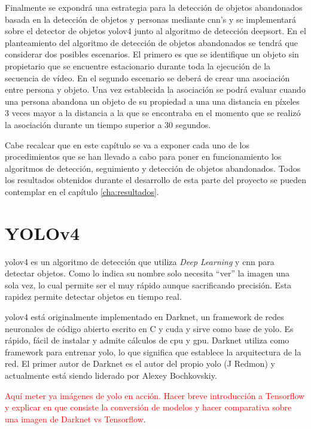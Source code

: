 Finalmente se expondrá una estrategia para la detección de objetos abandonados basada en la detección de objetos y personas mediante \gls{cnn}'s y se implementará sobre el detector de objetos \gls{yolov4} junto al algoritmo de detección \gls{deepsort}. En el planteamiento del algoritmo de detección de objetos abandonados se tendrá que considerar dos posibles escenarios. El primero es que se identifique un objeto sin propietario que se encuentre estacionario durante toda la ejecución de la secuencia de vídeo. En el segundo escenario se deberá de crear una asociación entre persona y objeto. Una vez establecida la asociación se podrá evaluar cuando una persona abandona un objeto de su propiedad a una una distancia en píxeles 3 veces mayor a la distancia a la que se encontraba en el momento que se realizó la asociación durante un tiempo superior a 30 segundos.

Cabe recalcar que en este capítulo se va a exponer cada uno de los procedimientos que se han llevado a cabo para poner en funcionamiento los algoritmos de detección, seguimiento y detección de objetos abandonados. Todos los resultados obtenidos durante el desarrollo de esta parte del proyecto se pueden contemplar en el capítulo \ref{cha:resultados}.

\section{YOLOv4}
\label{sec:desarrollo-yolov4}

\gls{yolov4} es un algoritmo de detección que utiliza \textit{Deep Learning} y \gls{cnn} para detectar objetos. Como lo indica su nombre solo necesita ``ver'' la imagen una sola vez, lo cual permite ser el muy rápido aunque sacrificando precisión. Esta rapidez permite detectar objetos en tiempo real.

\gls{yolov4} está originalmente implementado en Darknet, un framework de redes neuronales de código abierto escrito en C y \gls{cuda} y sirve como base de \gls{yolo}. Es rápido, fácil de instalar y admite cálculos de \gls{cpu} y \gls{gpu}. Darknet utiliza como framework para entrenar \gls{yolo}, lo que significa que establece la arquitectura de la red. El primer autor de Darknet es el autor del propio \gls{yolo} (J Redmon) y actualmente está siendo liderado por Alexey Bochkovskiy.

\textcolor{red}{Aquí meter ya imágenes de yolo en acción. Hacer breve introducción a Tensorflow y explicar en que consiste la conversión de modelos y hacer comparativa sobre una imagen de Darknet vs Tensorflow}.

